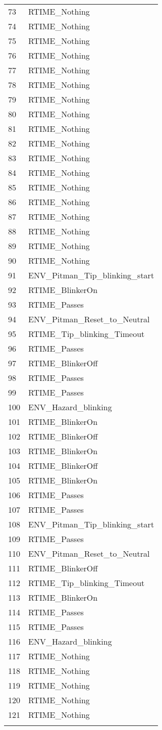 \documentclass[11pt]{article}
\begin{document}
\begin{longtable}{ll}
73 & RTIME\_Nothing \\
74 & RTIME\_Nothing \\
75 & RTIME\_Nothing \\
76 & RTIME\_Nothing \\
77 & RTIME\_Nothing \\
78 & RTIME\_Nothing \\
79 & RTIME\_Nothing \\
80 & RTIME\_Nothing \\
81 & RTIME\_Nothing \\
82 & RTIME\_Nothing \\
83 & RTIME\_Nothing \\
84 & RTIME\_Nothing \\
85 & RTIME\_Nothing \\
86 & RTIME\_Nothing \\
87 & RTIME\_Nothing \\
88 & RTIME\_Nothing \\
89 & RTIME\_Nothing \\
90 & RTIME\_Nothing \\
91 & ENV\_Pitman\_Tip\_blinking\_start \\
92 & RTIME\_BlinkerOn \\
93 & RTIME\_Passes \\
94 & ENV\_Pitman\_Reset\_to\_Neutral \\
95 & RTIME\_Tip\_blinking\_Timeout \\
96 & RTIME\_Passes \\
97 & RTIME\_BlinkerOff \\
98 & RTIME\_Passes \\
99 & RTIME\_Passes \\
100 & ENV\_Hazard\_blinking \\
101 & RTIME\_BlinkerOn \\
102 & RTIME\_BlinkerOff \\
103 & RTIME\_BlinkerOn \\
104 & RTIME\_BlinkerOff \\
105 & RTIME\_BlinkerOn \\
106 & RTIME\_Passes \\
107 & RTIME\_Passes \\
108 & ENV\_Pitman\_Tip\_blinking\_start \\
109 & RTIME\_Passes \\
110 & ENV\_Pitman\_Reset\_to\_Neutral \\
111 & RTIME\_BlinkerOff \\
112 & RTIME\_Tip\_blinking\_Timeout \\
113 & RTIME\_BlinkerOn \\
114 & RTIME\_Passes \\
115 & RTIME\_Passes \\
116 & ENV\_Hazard\_blinking \\
117 & RTIME\_Nothing \\
118 & RTIME\_Nothing \\
119 & RTIME\_Nothing \\
120 & RTIME\_Nothing \\
121 & RTIME\_Nothing \\

	\tend
\end{longtable}
\end{document}
